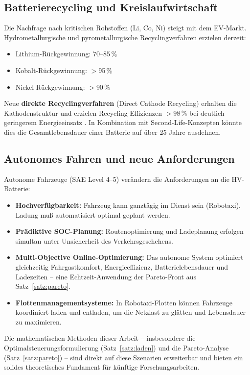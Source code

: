 ﻿\documentclass[a4paper,12pt]{article}
\theoremstyle{definition}
\begin{document}
\subsection{Batterierecycling und Kreislaufwirtschaft}

Die Nachfrage nach kritischen Rohstoffen (Li, Co, Ni) steigt mit dem
EV-Markt. Hydrometallurgische und pyrometallurgische Recyclingverfahren
erzielen derzeit:
\begin{itemize}
  \item Lithium-R\"uckgewinnung: 70--85\,\%
  \item Kobalt-R\"uckgewinnung: $>$95\,\%
  \item Nickel-R\"uckgewinnung: $>$90\,\%
\end{itemize}
Neue \textbf{direkte Recyclingverfahren} (Direct Cathode Recycling) erhalten
die Kathodenstruktur und erzielen Recycling-Effizienzen $>$98\,\% bei
deutlich geringerem Energieeinsatz \cite{Thompson2020}. In Kombination mit
Second-Life-Konzepten k\"onnte dies die Gesamtlebensdauer einer Batterie
auf \"uber 25 Jahre ausdehnen.

\subsection{Autonomes Fahren und neue Anforderungen}

Autonome Fahrzeuge (SAE Level 4--5) ver\"andern die Anforderungen an die
HV-Batterie:
\begin{itemize}
  \item \textbf{Hochverf\"ugbarkeit:} Fahrzeug kann ganzt\"agig im Dienst sein
    (Robotaxi), Ladung mu\ss{} automatisiert optimal geplant werden.
  \item \textbf{Pr\"adiktive SOC-Planung:} Routenoptimierung und Ladeplanung
    erfolgen simultan unter Unsicherheit des Verkehrsgeschehens.
  \item \textbf{Multi-Objective Online-Optimierung:} Das autonome System
    optimiert gleichzeitig Fahrgastkomfort, Energieeffizienz,
    Batterielebensdauer und Ladezeiten -- eine Echtzeit-Anwendung
    der Pareto-Front aus Satz~\ref{satz:pareto}.
  \item \textbf{Flottenmanagementsysteme:} In Robotaxi-Flotten k\"onnen
    Fahrzeuge koordiniert laden und entladen, um die Netzlast zu glätten
    und Lebensdauer zu maximieren.
\end{itemize}

Die mathematischen Methoden dieser Arbeit -- insbesondere die
Optimalsteuerungsformulierung (Satz~\ref{satz:laden}) und die
Pareto-Analyse (Satz~\ref{satz:pareto}) -- sind direkt auf diese
Szenarien erweiterbar und bieten ein solides theoretisches Fundament
f\"ur k\"unftige Forschungsarbeiten.
\end{document}

